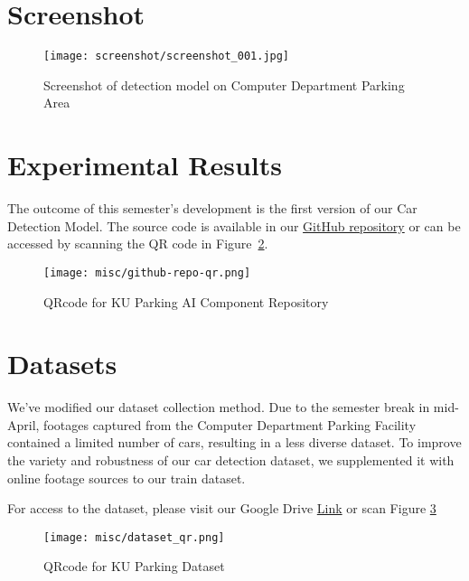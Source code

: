 \section{Screenshot}
\label{section:screenshot}
\begin{figure}[H]
    \centering
    \texttt{[image: screenshot/screenshot\_001.jpg]}
    \caption{Screenshot of detection model on Computer Department Parking Area}
    \label{fig:screenshot001}
\end{figure}


\section{Experimental Results}
\label{section:experimental-results}
The outcome of this semester’s development is the first version of our Car Detection Model. The source code is available in our \href{https://github.com/ReggieReo/ku-parking-ai-component}{GitHub repository} or can be accessed by scanning the QR code in Figure~\ref{fig:github-repo-ai-component-qr}.
\begin{figure}[H]
    \centering
    \texttt{[image: misc/github-repo-qr.png]}
    \caption{QRcode for KU Parking AI Component Repository}
    \label{fig:github-repo-ai-component-qr}
\end{figure}

\section{Datasets}
\label{section:datasets}
We've modified our dataset collection method. Due to the semester break in mid-April, footages captured from the Computer Department Parking Facility contained a limited number of cars, resulting in a less diverse dataset. To improve the variety and robustness of our car detection dataset, we supplemented it with online footage sources to our train dataset.

For access to the dataset, please visit our Google Drive \href{https://drive.google.com/drive/folders/1pOUgcbsFb1mpLc5oywZ2xQdRepm_nVu7?usp=sharing}{Link} or scan Figure \ref{fig:dataset-qr}
\begin{figure}[H]
    \centering
    \texttt{[image: misc/dataset\_qr.png]}
    \caption{QRcode for KU Parking Dataset}
    \label{fig:dataset-qr}
\end{figure}

